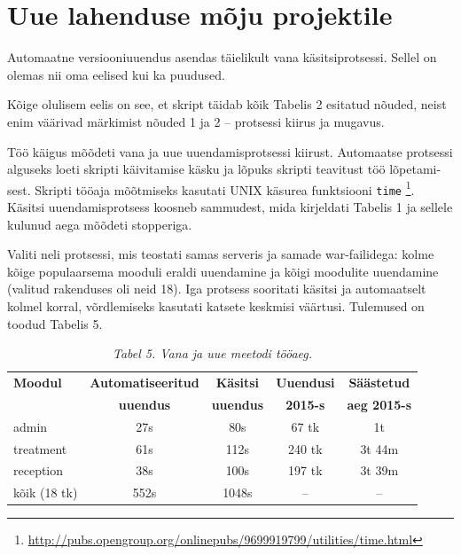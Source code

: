 \documentclass[12pt]{article}
\newcommand{\code}[1]{\texttt{#1}}
\begin{document}
  \newpage
  
  \section{Uue lahenduse mõju projektile}
  
  Automaatne versiooniuuendus asendas täielikult vana käsitsiprotsessi. Sellel on olemas nii oma eelised kui ka puudused.
  
  Kõige olulisem eelis on see, et skript täidab kõik Tabelis 2 esitatud nõuded, neist enim väärivad märkimist nõuded 1 ja 2 \--- protsessi kiirus ja mugavus.
  
  Töö käigus mõõdeti vana ja uue uuendamisprotsessi kiirust. Automaatse protsessi alguseks loeti skripti käivitamise käsku ja lõpuks skripti teavitust töö lõpetami\--sest. Skripti tööaja mõõtmiseks kasutati UNIX käsurea funktsiooni \code{time} \footnote{\url{http://pubs.opengroup.org/onlinepubs/9699919799/utilities/time.html}}. Käsitsi uuendamisprotsess koosneb sammudest, mida kirjeldati Tabelis 1 ja sellele kulunud aega mõõdeti stopperiga.
  
  Valiti neli protsessi, mis teostati samas serveris ja samade war\--failidega: kolme kõige populaarsema mooduli eraldi uuendamine ja kõigi moodulite uuendamine (valitud rakenduses oli neid 18). Iga protsess sooritati käsitsi ja automaatselt kolmel korral, võrdlemiseks kasutati katsete keskmisi väärtusi. Tulemused on toodud Tabelis 5.
  
  \begin{table}[!htbp]
    \begin{center}
      \caption*{\textit{Tabel 5. Vana ja uue meetodi tööaeg.}}
      
      \begin{tabular}{| l | c | c | c | c |}
        \hline
         \textbf{Moodul} & \textbf{Automatiseeritud} & \textbf{Käsitsi} & \textbf{Uuendusi} & \textbf{Säästetud}\\
         \textbf{} & \textbf{uuendus} & \textbf{uuendus} & \textbf{2015-s} & \textbf{aeg 2015-s}\\
        \hline
        admin & 27s & 80s & 67 tk & 1t\\
        treatment & 61s & 112s & 240 tk & 3t 44m\\
        reception & 38s & 100s & 197 tk & 3t 39m \\
        kõik (18 tk) & 552s & 1048s & \--- & \---\\
        \hline
      \end{tabular}
    \end{center}
  \end{table}
  
\end{document}
